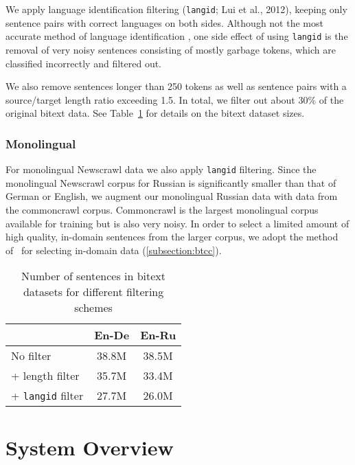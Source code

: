 \documentclass[11pt,a4paper]{article}
\begin{document}
We apply language identification filtering (\texttt{langid}; Lui et al., 2012)\nocite{lui2012langid}, keeping only sentence pairs with correct languages on both sides. 
Although not the most accurate method of language identification \cite{joulin2016bag}, one side effect of using \texttt{langid} is the removal of very noisy sentences consisting of mostly garbage tokens, which are classified incorrectly and filtered out. 

We also remove sentences longer than 250 tokens  as  well  as  sentence pairs with  a  source/target  length  ratio  exceeding  1.5. 
In total, we filter out about 30\% of the original bitext data.
See Table~\ref{tab:bitext_size} for details on the bitext dataset sizes.

\subsubsection{Monolingual}
For monolingual Newscrawl data we also apply \texttt{langid} filtering. 
Since the monolingual Newscrawl corpus for Russian is significantly smaller than that of German or English, we augment our monolingual Russian data with data from the commoncrawl corpus.
Commoncrawl is the largest monolingual corpus available for training but is also very noisy.
In order to select a limited amount of high quality, in-domain sentences from the larger corpus, we adopt the method of~\citet{moore2010intelligent} for selecting in-domain data (\textsection\ref{subsection:btcc}).

\begin{table}[t]
\centering
\begin{tabular}{lcc}
\toprule
& En-De & En-Ru \\ \midrule
No filter & 38.8M & 38.5M \\
+ length filter & 35.7M & 33.4M \\
+ \texttt{langid} filter & 27.7M & 26.0M \\
\bottomrule
\end{tabular}
\caption{Number of sentences in bitext datasets for different filtering schemes}

\label{tab:bitext_size}
\end{table}


 
\section{System Overview}
\setlength{\abovedisplayskip}{5pt}
\setlength{\belowdisplayskip}{5pt}
\end{document}
